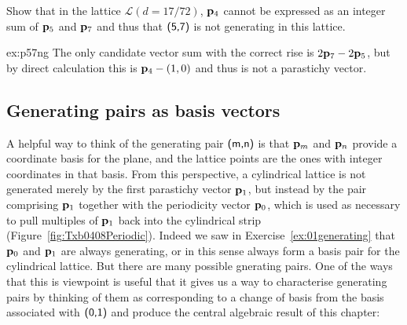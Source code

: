 \begin{jExercise}\label{ex:p57ng}
	Show that in the lattice $\mathcal{L}(d=17/72)$, ${\mathbf p}_{4}$ cannot be expressed as an integer sum of ${\mathbf p}_{5}$ and ${\mathbf p}_{7}$ and thus that $\textsf{(5,7)}$ is not generating in this lattice.
\end{jExercise}
\begin{jAnswer}{ex:p57ng}
	The only candidate vector sum with the correct rise is $2{\mathbf p}_{7}-2{\mathbf p}_{5}$, but by direct calculation this is ${\mathbf p}_{4}-(1,0)$ and thus is not a parastichy vector. 
\end{jAnswer}


\subsection{Generating pairs as basis vectors}
 A helpful way to think of the generating pair $\textsf{(m,n)}$ is that  ${\mathbf p}_{m}$ and ${\mathbf p}_{n}$ provide a coordinate basis for the plane, and the lattice points are the ones with integer coordinates in that basis. From this perspective, a cylindrical lattice is not generated merely by the first parastichy vector ${\mathbf p}_{1}$, but instead by  the pair comprising  ${\mathbf p}_{1}$ together with the periodicity vector ${\mathbf p}_{0}$, which is used as necessary to pull multiples of ${\mathbf p}_{1}$ back into the cylindrical strip (Figure~\ref{fig:Txb0408Periodic}).
 Indeed we saw in Exercise~\ref{ex:01generating} that ${\mathbf p}_{0}$ and ${\mathbf p}_{1}$ are always generating, or in this sense always form a basis pair for the cylindrical lattice. 
 But there are many possible gnerating pairs. 
 One of the ways that this is viewpoint is useful  that it gives us a way to characterise generating pairs by thinking of them as corresponding to a change of basis from the basis associated with $\textsf{(0,1)}$ and produce the central algebraic result of this chapter:

